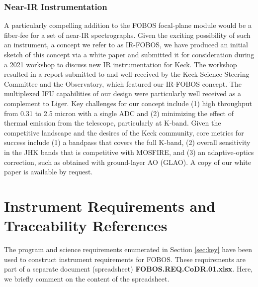 \documentclass[11pt,a4paper,twoside,onecolumn,openany,final,oldfontcommands]{memoir}
\begin{document}
\subsection{Near-IR Instrumentation}


A particularly compelling addition to the FOBOS focal-plane module would be a fiber-fee for a set of near-IR spectrographs. Given the exciting possibility of such an instrument, a concept we refer to as IR-FOBOS, we have produced an initial sketch of this concept via a white paper and submitted it for consideration during a 2021 workshop to discuss new IR instrumentation for Keck.  The workshop resulted in a report submitted to and well-received by the Keck Science Steering Committee and the Observatory, which featured our IR-FOBOS concept.  The multiplexed IFU capabilities of our design were particularly well received as a complement to Liger.  Key challenges for our concept include (1) high throughput from 0.31 to 2.5 micron with a single ADC and (2) minimizing the effect of thermal emission from the telescope, particularly at K-band.  Given the competitive landscape and the desires of the Keck community, core metrics for success include (1) a bandpass that covers the full K-band, (2) overall sensitivity in the JHK bands that is competitive with MOSFIRE, and (3) an adaptive-optics correction, such as obtained with ground-layer AO (GLAO). A copy of our white paper is available by request.


\chapter{Instrument Requirements and Traceability References}
\label{sec:instr}


The program and science requirements enumerated in Section \ref{sec:key} have been used to construct instrument requirements for FOBOS.  These requirements are part of a separate document (spreadsheet) \textbf{FOBOS.REQ.CoDR.01.xlsx}.  Here, we briefly comment on the content of the spreadsheet.
\end{document}
